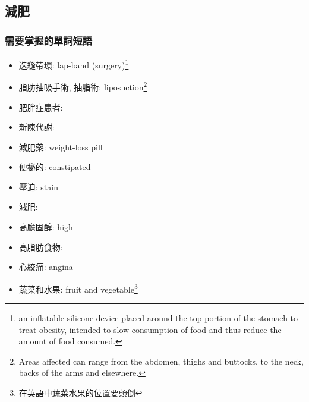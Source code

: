 \subsection{減肥}
\subsubsection*{需要掌握的單詞短語}
\begin{multicols}{2}
\begin{itemize}
  \itemsep0em
  \item 迭縫帶環: lap-band (surgery)\footnote{an inflatable silicone device placed around the top portion of the stomach to treat obesity, intended to slow consumption of food and thus reduce the amount of food consumed.}
  \item 脂肪抽吸手術, 抽脂術: liposuction\footnote{Areas affected can range from the abdomen, thighs and buttocks, to the neck, backs of the arms and elsewhere.}
  \item 肥胖症患者: 
  \item 新陳代謝: 
  \item 減肥藥: weight-loss pill
  \item 便秘的: constipated
  \item 壓迫: stain
  \item 減肥: 
  \item 高膽固醇: high 
  \item 高脂肪食物: 
  \item 心絞痛: angina
  \item 蔬菜和水果: fruit and vegetable\footnote{在英語中蔬菜水果的位置要顛倒}
\end{itemize}
\end{multicols}

